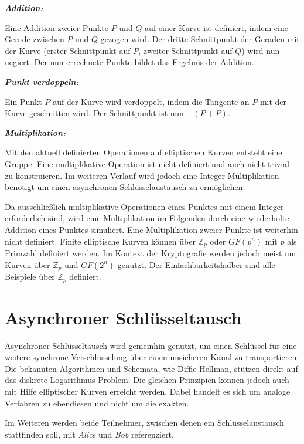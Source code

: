 \textit{\textbf{Addition:}}

Eine Addition zweier Punkte $P$ und $Q$ auf einer Kurve ist definiert, indem eine Gerade zwischen $P$ und $Q$ 
gezogen wird. Der dritte Schnittpunkt der Geraden mit der Kurve (erster Schnittpunkt auf $P$, zweiter 
Schnittpunkt auf $Q$) wird nun negiert. Der nun errechnete Punkte bildet das Ergebnis der Addition.

\textit{\textbf{Punkt verdoppeln:}}

Ein Punkt $P$ auf der Kurve wird verdoppelt, indem die Tangente an $P$ mit der Kurve geschnitten wird. Der Schnittpunkt
ist nun $-(P+P)$.

\textit{\textbf{Multiplikation:}}

Mit den aktuell definierten Operationen auf elliptischen Kurven entsteht eine Gruppe. 
Eine multiplikative Operation ist nicht definiert und auch nicht trivial zu konstruieren.
Im weiteren Verlauf wird jedoch eine Integer-Multiplikation benötigt um einen asynchronen Schlüsselaustausch zu ermöglichen.

Da ausschließlich multiplikative Operationen eines Punktes mit einem Integer erforderlich sind, wird 
eine Multiplikation im Folgenden durch eine wiederholte Addition eines Punktes simuliert.
Eine Multiplikation zweier Punkte ist weiterhin nicht definiert.
\newline
\newline
Finite elliptische Kurven können über $\mathbb{Z}_p$ oder $GF(p^n)$ mit $p$ als Primzahl definiert werden.
Im Kontext der Kryptografie werden jedoch meist nur Kurven über $\mathbb{Z}_p$ und $GF(2^n)$ genutzt.
Der Einfachbarkeitshalber sind alle Beispiele über $\mathbb{Z}_p$ definiert.


\section{Asynchroner Schlüsseltausch}

Asynchroner Schlüsseltausch wird gemeinhin genutzt, um einen Schlüssel für eine weitere synchrone Verschlüsselung über 
einen unsicheren Kanal zu transportieren. Die bekannten Algorithmen und Schemata, wie Diffie-Hellman, stützen direkt auf
das diskrete Logarithmus-Problem. Die gleichen Prinzipien können jedoch auch mit Hilfe elliptischer Kurven erreicht 
werden. Dabei handelt es sich um analoge Verfahren zu ebendiesen und nicht um die exakten.

Im Weiteren werden beide Teilnehmer, zwischen denen ein Schlüsselaustausch stattfinden soll, mit \textit{Alice} und \textit{Bob}
referenziert.

